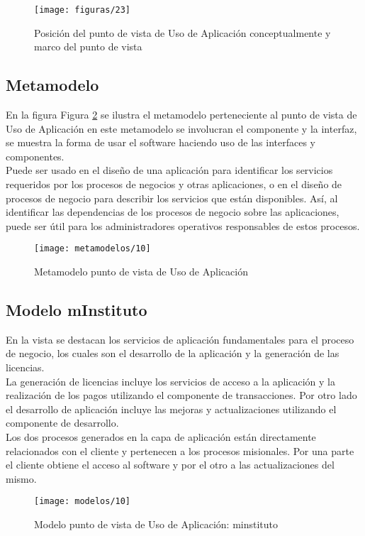   \begin{figure}[H]
  	\centering
  	\texttt{[image: figuras/23]}
  	\captionsetup{width=.95\textwidth}
  	\caption{Posición del punto de vista de Uso de Aplicación conceptualmente y marco del punto de vista \cite{ref9}}
  	\label{figura23}
  \end{figure}
  
  \subsection{Metamodelo}
  En la figura Figura \ref{metamodelo10} se ilustra el metamodelo perteneciente al punto de vista de Uso de Aplicación en este metamodelo se involucran el componente y la interfaz, se muestra la forma de usar el software haciendo uso de las interfaces y componentes. \\
  
  Puede ser usado en el diseño de una aplicación para identificar los servicios requeridos por los procesos de negocios y otras aplicaciones, o en el diseño de procesos de negocio para describir los servicios que están disponibles. Así, al identificar las dependencias de los procesos de negocio sobre las aplicaciones, puede ser útil para los administradores operativos responsables de estos procesos. \cite{ref9}
  
  \begin{figure}[H]
  	\centering
  	\texttt{[image: metamodelos/10]}
  	\captionsetup{width=.95\textwidth}
  	\caption{Metamodelo punto de vista de Uso de Aplicación \cite{ref9}}
  	\label{metamodelo10}
  \end{figure}
  
  \subsection{Modelo mInstituto}
  En la vista se destacan los servicios de aplicación fundamentales para el proceso de negocio, los cuales son el desarrollo de la aplicación y la generación de las licencias. \\
  
  La generación de licencias incluye los servicios de acceso a la aplicación y la realización de los pagos utilizando el componente de transacciones. Por otro lado el desarrollo de aplicación incluye las mejoras y actualizaciones utilizando el componente de desarrollo.\\
  
  Los dos procesos generados en la capa de aplicación están directamente relacionados con el cliente y pertenecen a los procesos misionales. Por una parte el cliente obtiene el acceso al software y por el otro a las actualizaciones del mismo.
  
  \begin{figure}[H]
  	\centering
  	\texttt{[image: modelos/10]}
  	\captionsetup{width=.95\textwidth}
  	\caption{Modelo punto de vista de Uso de Aplicación: minstituto}
  	\label{modelo10}
  \end{figure}
